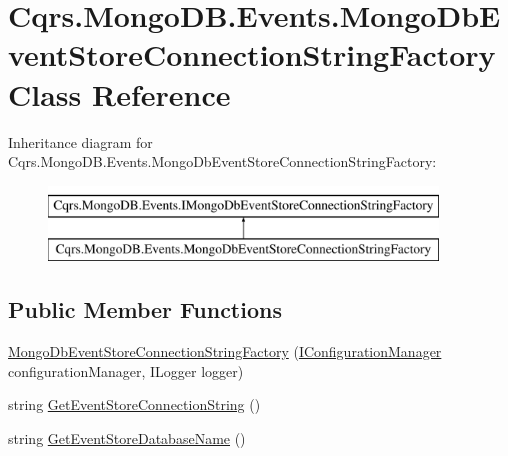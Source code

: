 \hypertarget{classCqrs_1_1MongoDB_1_1Events_1_1MongoDbEventStoreConnectionStringFactory}{}\section{Cqrs.\+Mongo\+D\+B.\+Events.\+Mongo\+Db\+Event\+Store\+Connection\+String\+Factory Class Reference}
\label{classCqrs_1_1MongoDB_1_1Events_1_1MongoDbEventStoreConnectionStringFactory}
Inheritance diagram for Cqrs.\+Mongo\+D\+B.\+Events.\+Mongo\+Db\+Event\+Store\+Connection\+String\+Factory\+:\begin{figure}[H]
\begin{center}
\leavevmode
\includegraphics[height=2.000000cm]{classCqrs_1_1MongoDB_1_1Events_1_1MongoDbEventStoreConnectionStringFactory}
\end{center}
\end{figure}
\subsection*{Public Member Functions}
\begin{DoxyCompactItemize}
\item 
\hyperlink{classCqrs_1_1MongoDB_1_1Events_1_1MongoDbEventStoreConnectionStringFactory_afb24fa31922f1297f7d7d80c7b14ee14_afb24fa31922f1297f7d7d80c7b14ee14}{Mongo\+Db\+Event\+Store\+Connection\+String\+Factory} (\hyperlink{interfaceCqrs_1_1Configuration_1_1IConfigurationManager}{I\+Configuration\+Manager} configuration\+Manager, I\+Logger logger)
\item 
string \hyperlink{classCqrs_1_1MongoDB_1_1Events_1_1MongoDbEventStoreConnectionStringFactory_af78f60c035678185ecd266019f42838b_af78f60c035678185ecd266019f42838b}{Get\+Event\+Store\+Connection\+String} ()
\item 
string \hyperlink{classCqrs_1_1MongoDB_1_1Events_1_1MongoDbEventStoreConnectionStringFactory_a282bda17095c8ea293f5305ea0d1b83c_a282bda17095c8ea293f5305ea0d1b83c}{Get\+Event\+Store\+Database\+Name} ()
\end{DoxyCompactItemize}
